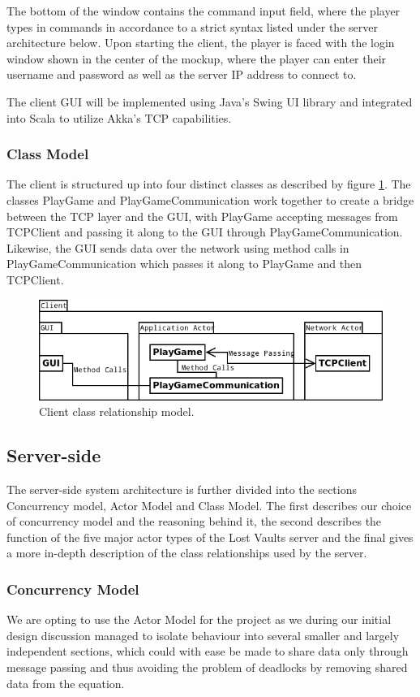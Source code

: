 \documentclass[a4paper]{article}
\begin{document}
The bottom of the window contains the command input field, where the player types in commands in accordance to a strict syntax listed under the server architecture below.
Upon starting the client, the player is faced with the login window shown in the center of the mockup, where the player can enter their username and password as well as the server IP address to connect to.

The client GUI will be implemented using Java's Swing UI library and integrated into Scala to utilize Akka's TCP capabilities.
\subsubsection{Class Model}
The client is structured up into four distinct classes as described by figure \ref{fig:ClientArch}. The classes PlayGame and PlayGameCommunication work together to create a bridge between the TCP layer and the GUI, with PlayGame accepting messages from TCPClient and passing it along to the GUI through PlayGameCommunication. 
Likewise, the GUI sends data over the network  using method calls in PlayGameCommunication which passes it along to PlayGame and then TCPClient.
\begin{figure}[hbt]
\centering
\includegraphics[width=1.0\textwidth]{clientuml1}
\caption{\label{fig:ClientArch}Client class relationship model.}
\end{figure}
\subsection{Server-side}
The server-side system architecture is further divided into the sections Concurrency model, Actor Model and Class Model. The first describes our choice of concurrency model and the 
reasoning behind it, the second describes  the function of the five major actor types of the Lost Vaults server and the final gives a more in-depth description of the 
class relationships used by the server.
\subsubsection{Concurrency Model}
We are opting to use the Actor Model for the project as we during our initial design discussion managed to isolate behaviour into several smaller and largely independent sections, 
which could with ease be made to share data only through message passing and thus avoiding the problem of deadlocks by removing shared data from the equation. 
\end{document}
